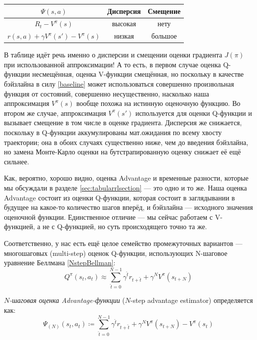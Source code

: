 \vspace{0.2cm}
\begin{center}
\begin{tabular}{ccc}
\toprule
    \textbf{$\Psi (s, a)$} & \textbf{Дисперсия} & \textbf{Смещение}  \\
\midrule
    $R_t - V^\pi(s)$ & высокая & нету \\
    \hdashline
    $r(s, a) + \gamma V^\pi(s') - V^\pi(s)$ & низкая & большое \\
\bottomrule
\end{tabular}
\end{center}
\vspace{0.2cm}

В таблице идёт речь именно о дисперсии и смещении оценки градиента $J(\pi)$ при использованной аппроксимации! А то есть, в первом случае оценка Q-функции несмещённая, оценка V-функции смещённая, но поскольку в качестве бэйзлайна в силу \eqref{baseline} может использоваться совершенно произвольная функция от состояний, совершенно несущественно, насколько наша аппроксимация $V^\pi(s)$ вообще похожа на истинную оценочную функцию. Во втором же случае, аппроксимация $V^\pi(s')$ используется для оценки Q-функции и вызывает смещение в том числе в оценке градиента. Дисперсия же снижается, поскольку в Q-функции аккумулированы мат.ожидания по всему хвосту траектории; она в обоих случаях существенно ниже, чем до введения бэйзлайна, но замена Монте-Карло оценки на бутстрапированную оценку снижает её ещё сильнее.

Как, вероятно, хорошо видно, оценка Advantage и временные разности, которые мы обсуждали в разделе \ref{sec:tabularrlsection} --- это одно и то же. Наша оценка Advantage состоит из оценки Q-функции, которая состоит в заглядывании в будущее на какое-то количество шагов вперёд, и бэйзлайна --- исходного значения оценочной функции. Единственное отличие --- мы сейчас работаем с V-функцией, а не с Q-функцией, но суть происходящего точно та же.

Соответственно, у нас есть ещё целое семейство промежуточных вариантов --- многошаговых (multi-step) оценок Q-функции, использующих N-шаговое уравнение Беллмана \eqref{NstepBellman}:
$$Q^\pi(s_t, a_t) \approx \sum_{\hat{t}=0}^{N-1} \gamma^{\hat{t}} r_{t + \hat{t}} + \gamma^N V^\pi(s_{t + N}) $$
\begin{definition}
\emph{$N$-шаговая оценка Advantage-функции} ($N$-step advantage estimator) определяется как:
\begin{equation}\label{Nstepadvantage}
\Psi_{(N)} (s_t, a_t) \coloneqq \sum_{\hat{t}=0}^{N-1} \gamma^{\hat{t}} r_{t + \hat{t}} + \gamma^N V^\pi(s_{t + N}) - V^\pi(s_t)
\end{equation}
\end{definition}

